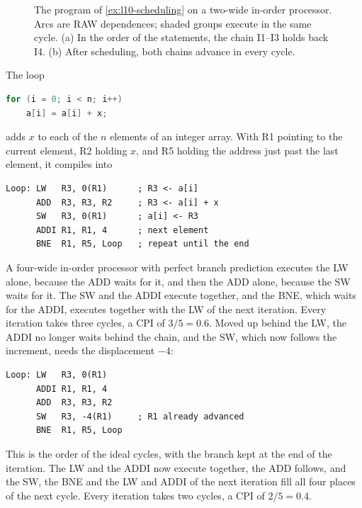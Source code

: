 \documentclass[../main.tex]{subfiles}
\begin{document}
\begin{figure}[htbp]
  \centering
  
  \caption{The program of \cref{ex:l10-scheduling} on a two-wide in-order
    processor.  Arcs are RAW dependences; shaded groups execute in the same
    cycle.  (a) In the order of the statements, the chain I1--I3 holds back
    I4.  (b) After scheduling, both chains advance in every cycle.}
  \label{fig:l10-scheduling}
\end{figure}

\begin{example}
  \label{ex:l10-loop}
  The loop
  \begin{lstlisting}[language=C, numbers=none]
for (i = 0; i < n; i++)
    a[i] = a[i] + x;
\end{lstlisting}
  adds $x$ to each of the $n$ elements of an integer array.  With R1 pointing
  to the current element, R2 holding $x$, and R5 holding the address just past
  the last element, it compiles into
  \begin{lstlisting}[language={[x86masm]Assembler}, numbers=none]
Loop: LW   R3, 0(R1)      ; R3 <- a[i]
      ADD  R3, R3, R2     ; R3 <- a[i] + x
      SW   R3, 0(R1)      ; a[i] <- R3
      ADDI R1, R1, 4      ; next element
      BNE  R1, R5, Loop   ; repeat until the end
\end{lstlisting}
  A four-wide in-order processor with perfect branch prediction executes the
  LW alone, because the ADD waits for it, and then the ADD alone, because the
  SW waits for it.  The SW and the ADDI execute together, and the BNE, which
  waits for the ADDI, executes together with the LW of the next iteration.
  Every iteration takes three cycles, a CPI of $3/5 = 0.6$.  Moved up behind
  the LW, the ADDI no longer waits behind the chain, and the SW, which now
  follows the increment, needs the displacement $-4$:
  \begin{lstlisting}[language={[x86masm]Assembler}, numbers=none]
Loop: LW   R3, 0(R1)
      ADDI R1, R1, 4
      ADD  R3, R3, R2
      SW   R3, -4(R1)     ; R1 already advanced
      BNE  R1, R5, Loop
\end{lstlisting}
  This is the order of the ideal cycles, with the branch kept at the end of
  the iteration.  The LW and the ADDI now execute together, the ADD follows,
  and the SW, the BNE and the LW and ADDI of the next iteration fill all four
  places of the next cycle.  Every iteration takes two cycles, a CPI of
  $2/5 = 0.4$.
\end{example}
\end{document}
